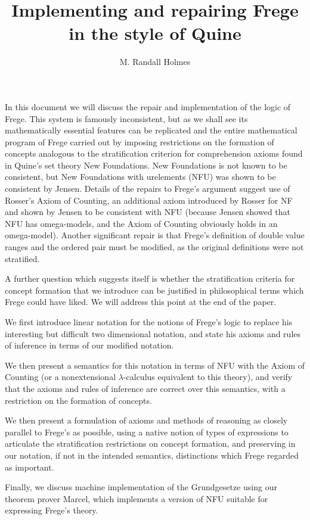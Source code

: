 \documentclass{article}
\title{Implementing and repairing Frege in the style of Quine}
\author{M. Randall Holmes}
\begin{document}
\maketitle

In this document we will discuss the repair and implementation of the logic of Frege.  This system is famously inconsistent, but as we shall see its mathematically essential features can be replicated and the entire mathematical program of Frege carried out by imposing restrictions on the formation of concepts analogous to the stratification criterion for comprehension axioms found in Quine's set theory New Foundations.  New Foundations is not known to be consistent, but New Foundations with urelements (NFU) was shown to be consistent by Jensen.  Details of the repairs to Frege's argument suggest use of Rosser's Axiom of Counting, an additional axiom introduced by Rosser for NF and shown by Jensen to be consistent with NFU (because Jensen showed that NFU has omega-models, and the Axiom of Counting obviously holds in an omega-model).  Another significant repair is that Frege's definition of double value ranges and the ordered pair must be modified, as the original definitions were not stratified.

A further question which suggests itself is whether the stratification criteria for concept formation that we introduce can be justified in philosophical terms which Frege could have liked.  We will address this point at the end of the paper.

We first introduce linear notation for the notions of Frege's logic to replace his interesting but difficult two dimensional notation, and state his axioms and rules of inference in terms of our modified notation.

We then present a semantics for this notation in terms of NFU with the Axiom of Counting (or a nonextensional $\lambda$-calculus equivalent to this theory), and verify that the axioms and rules of inference are correct over this semantics, with a restriction on the formation of concepts.

We then present a formulation of axioms and methods of reasoning as closely parallel to Frege's as possible, using a native notion of types of expressions to articulate the stratification restrictions on concept formation, and preserving in our notation, if not in the intended semantics, distinctions which Frege regarded as important.

Finally, we discuss machine implementation of the Grundgesetze using our theorem prover Marcel, which implements a version of NFU suitable for expressing Frege's theory.
\end{document}
